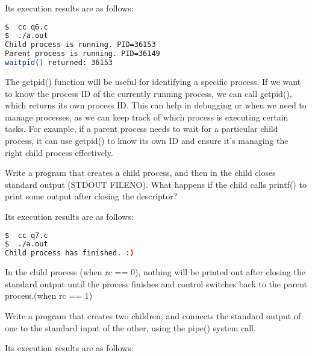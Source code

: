 \documentclass[10pt, answers]{exam}
\begin{document}
\begin{questions}
\begin{solution}


Its execution results are as follows:

\begin{lstlisting}[language=bash]
$  cc q6.c
$  ./a.out  
Child process is running. PID=36153
Parent process is running. PID=36149
waitpid() returned: 36153
\end{lstlisting}

The getpid() function will be useful for identifying a specific process. If we want to know the process ID of the currently running process, we can call getpid(), which returns its own process ID. This can help in debugging or when we need to manage processes, as we can keep track of which process is executing certain tasks. For example, if a parent process needs to wait for a particular child process, it can use getpid() to know its own ID and ensure it's managing the right child process effectively.

\end{solution}

\question
Write a program that creates a child process, and then in the child closes standard output (STDOUT FILENO). What happens if the child calls printf() to print some output after closing the descriptor?\begin{solution}



Its execution results are as follows:

\begin{lstlisting}[language=bash]
$  cc q7.c
$  ./a.out  
Child process has finished. :)
\end{lstlisting}

In the child process (when rc == 0), nothing will be printed out after closing the standard output until the process finishes and control switches back to the parent process.(when rc == 1)

\end{solution}

\question
Write a program that creates two children, and connects the standard output of one to the standard input of the other, using the pipe() system call.
\begin{solution}


Its execution results are as follows:


\end{solution}
\end{questions}
\end{document}

